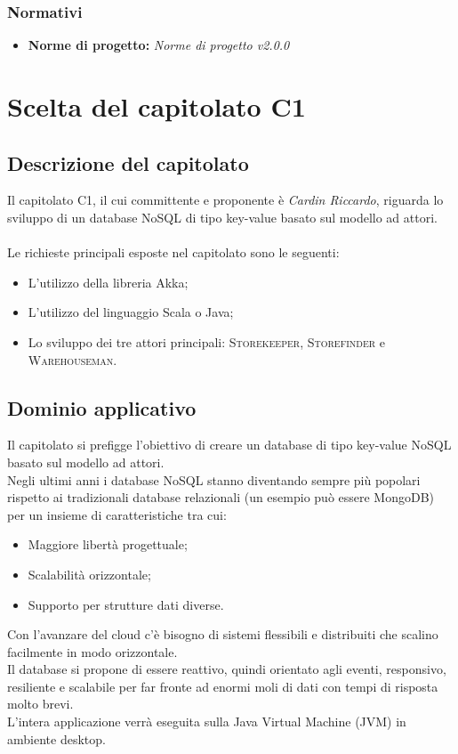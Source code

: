 \documentclass[a4paper]{article}
\begin{document}
	\subsubsection{Normativi}
		\begin{itemize}
			\item \textbf{Norme di progetto:} \emph{Norme di progetto v2.0.0}
		\end{itemize}

	\newpage	
	\section{Scelta del capitolato C1}
		\subsection{Descrizione del capitolato}
			Il capitolato C1, il cui committente e proponente è \emph{Cardin Riccardo}, riguarda lo sviluppo 
			di un database NoSQL di tipo key-value basato sul modello ad attori.
			\\ \\
			Le richieste principali esposte nel capitolato sono le seguenti:
			\begin{itemize}
				\item L'utilizzo della libreria Akka;
				\item L'utilizzo del linguaggio Scala o Java;
				\item Lo sviluppo dei tre attori principali: \textsc{Storekeeper},
				 \textsc{Storefinder} e \textsc{Warehouseman}.
			\end{itemize}
		\subsection{Dominio applicativo}
			Il capitolato si prefigge l'obiettivo di creare un database di tipo key-value NoSQL basato sul
			modello ad attori. \\
			Negli ultimi anni i database NoSQL stanno diventando sempre più popolari  rispetto ai tradizionali
			database relazionali (un esempio può essere MongoDB) per un insieme di caratteristiche tra cui: 
			\begin{itemize}
				\item Maggiore libertà progettuale;
				\item Scalabilità orizzontale;
				\item Supporto per strutture dati diverse.
			\end{itemize}
			Con l'avanzare del cloud c'è bisogno di sistemi flessibili e distribuiti che scalino facilmente in modo
			orizzontale. \\
			Il database si propone di essere reattivo, quindi orientato agli eventi, responsivo, resiliente e
			scalabile per far fronte ad enormi moli di dati con tempi di risposta molto brevi. \\
			L'intera applicazione verrà eseguita sulla Java Virtual Machine (JVM) in ambiente
			 desktop.
\end{document}
